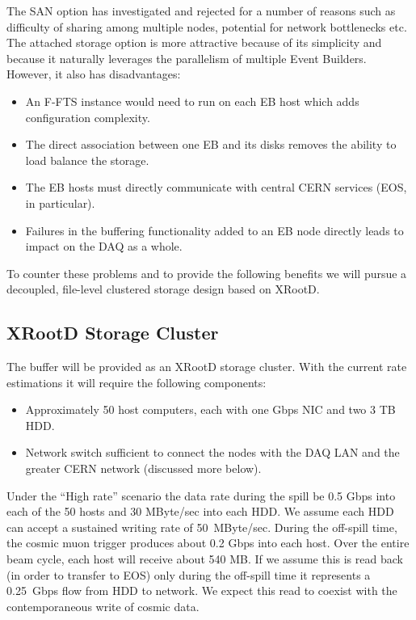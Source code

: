 \documentclass[pdftex,12pt,letter]{article}
\newcommand{\xrd}{XRootD\xspace}
\begin{document}
\noindent The SAN option has investigated and rejected for a number of reasons such as difficulty of sharing among multiple
nodes, potential for network bottlenecks etc. The attached storage option is more attractive because of its simplicity and because it
naturally leverages the parallelism of multiple Event Builders.
However, it also has disadvantages:
\begin{itemize}
\item An F-FTS instance would need to run on each EB host which adds configuration complexity.
\item The direct association between one EB and its disks removes the ability to load balance the storage.
\item The EB hosts must directly communicate with central CERN services (EOS, in particular).
\item Failures in the buffering functionality added to an EB node directly leads to impact on the DAQ as a whole.
\end{itemize}

To counter these problems and to provide the following
benefits we will pursue a decoupled, file-level clustered storage
design based on \xrd\cite{xrootd}.  

\subsection{\xrd Storage Cluster}

The buffer will be provided as an \xrd storage cluster. With the
current rate estimations it will require the following components:

\begin{itemize}
\item Approximately 50 host computers, each with one Gbps NIC and two 3 TB HDD.
\item Network switch sufficient to connect the nodes with the DAQ LAN
  and the greater CERN network (discussed more below).
\end{itemize}

\noindent Under the ``High rate'' scenario the data rate during the
spill be 0.5 Gbps into each of the 50 hosts and 30 MByte/sec into each
HDD.  We assume each HDD can accept a sustained writing rate of
50~MByte/sec.  During the off-spill time, the cosmic muon trigger
produces about 0.2 Gbps into each host.  Over the entire beam cycle,
each host will receive about 540 MB.  If we assume this is read back
(in order to transfer to EOS) only during the off-spill time it
represents a 0.25~Gbps flow from HDD to network.  We expect this read
to coexist with the contemporaneous write of cosmic data.
\end{document}
